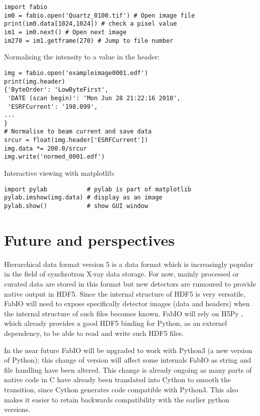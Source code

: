 \documentclass[preprint ]{iucr}
\begin{document}
\begin{verbatim}
import fabio     
im0 = fabio.open('Quartz_0100.tif') # Open image file
print(im0.data[1024,1024]) # check a pixel value
im1 = im0.next() # Open next image
im270 = im1.getframe(270) # Jump to file number
\end{verbatim}

Normalising the intensity to a value in the header:

\begin{verbatim}
img = fabio.open('exampleimage0001.edf')
print(img.header)
{'ByteOrder': 'LowByteFirst',
 'DATE (scan begin)': 'Mon Jun 28 21:22:16 2010',
 'ESRFCurrent': '198.099',
...
}
# Normalise to beam current and save data
srcur = float(img.header['ESRFCurrent'])
img.data *= 200.0/srcur
img.write('normed_0001.edf')
\end{verbatim}

Interactive viewing with matplotlib:

\begin{verbatim}
import pylab           # pylab is part of matplotlib
pylab.imshow(img.data) # display as an image
pylab.show()           # show GUI window
\end{verbatim}


\section{Future and perspectives}

Hierarchical data format version 5 \cite{hdf5} is a data format which is
increasingly popular in the field of synchrotron X-ray data storage.
For now, mainly processed or curated data are stored in this format but 
new detectors are rumoured to provide native output in HDF5.
Since the internal structure of HDF5 is very versatile, FabIO will need to expose 
specifically detector images (data and headers) when the internal structure 
of such files becomes known. FabIO will rely on H5Py \cite{h5py}, which already
provides a good HDF5 binding for Python, as an externel dependency, to be able
to read and write such HDF5 files.

In the near future FabIO will be upgraded to work with Python3 (a new version of 
Python); this change of version will affect some internals FabIO as string and 
file handling have been altered.
This change is already ongoing as many parts of native code in C have already
been translated into Cython \cite{cython} to smooth the transition, since 
Cython generates code compatible with Python3. 
This also makes it easier to retain backwards compatibility with the earlier
python versions. %
\end{document}
